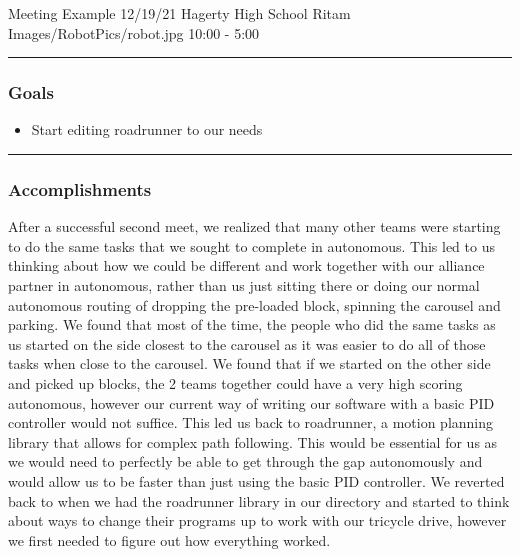 \insertmeeting 
	{Meeting Example} 
	{12/19/21} 
	{Hagerty High School}
	{Ritam}
	{Images/RobotPics/robot.jpg}
	{10:00 - 5:00}
	
\noindent\hfil\rule{\textwidth}{.4pt}\hfil
\subsubsection*{Goals}
\begin{itemize}
    \item Start editing roadrunner to our needs 

\end{itemize} 

\noindent\hfil\rule{\textwidth}{.4pt}\hfil

\subsubsection*{Accomplishments}
After a successful second meet, we realized that many other teams were starting to do the same tasks that we sought to complete in autonomous. This led to us thinking about how we could be different and work together with our alliance partner in autonomous, rather than us just sitting there or doing our normal autonomous routing of dropping the pre-loaded block, spinning the carousel and parking. We found that most of the time, the people who did the same tasks as us started on the side closest to the carousel as it was easier to do all of those tasks when close to the carousel. We found that if we started on the other side and picked up blocks, the 2 teams together could have a very high scoring autonomous, however our current way of writing our software with a basic PID controller would not suffice. This led us back to roadrunner, a motion planning library that allows for complex path following. This would be essential for us as we would need to perfectly be able to get through the gap autonomously and would allow us to be faster than just using the basic PID controller. We reverted back to when we had the roadrunner library in our directory and started to think about ways to change their programs up to work with our tricycle drive, however we first needed to figure out how everything worked. 
 


